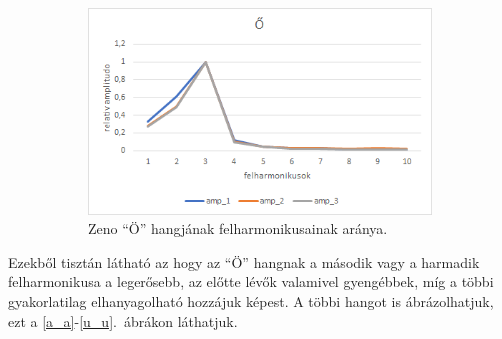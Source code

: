 \documentclass[a4paper,12pt]{article}
\begin{document}
\begin{figure}[h!]
\begin{subfigure}[t]{.5\linewidth}
\includegraphics[width = \linewidth]{zeno_o.png}
\caption{Zeno ``Ö'' hangjának felharmonikusainak aránya.}
\end{subfigure}
\caption{}
\label{o_felharmonikusok}
\end{figure}

Ezekből tisztán látható az hogy az ``Ö'' hangnak a második vagy a harmadik felharmonikusa a legerősebb, az előtte lévők valamivel gyengébbek, míg a többi gyakorlatilag elhanyagolható hozzájuk képest. A többi hangot is ábrázolhatjuk, ezt a \ref{a_a}-\ref{u_u}.\ ábrákon láthatjuk.
\end{document}
